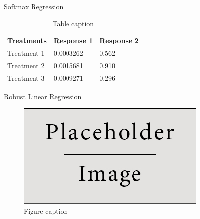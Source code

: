 \documentclass[final]{beamer}
\newlength{\sepwid}
\newlength{\onecolwid}
\newlength{\twocolwid}
\begin{document}
\begin{frame}[t]
\begin{columns}[t]
\begin{column}{\twocolwid}
\begin{columns}[t,totalwidth=\twocolwid]
\begin{column}{\onecolwid}
\begin{block}{Softmax Regression}
\begin{table}
\vspace{2ex}
\begin{tabular}{l l l}
\toprule
\textbf{Treatments} & \textbf{Response 1} & \textbf{Response 2}\\
\midrule
Treatment 1 & 0.0003262 & 0.562 \\
Treatment 2 & 0.0015681 & 0.910 \\
Treatment 3 & 0.0009271 & 0.296 \\
\bottomrule
\end{tabular}
\caption{Table caption}
\end{table}

\end{block}

\begin{block}{Robust Linear Regression}

\begin{figure}
\includegraphics[width=0.8\linewidth]{placeholder.jpg}
\caption{Figure caption}
\end{figure}

\end{block}


\end{column} %

\end{columns} %

\end{column} %

\begin{column}{\sepwid}\end{column} %

\begin{column}{\onecolwid} %



\end{column}
\end{columns}
\end{frame}
\end{document}
